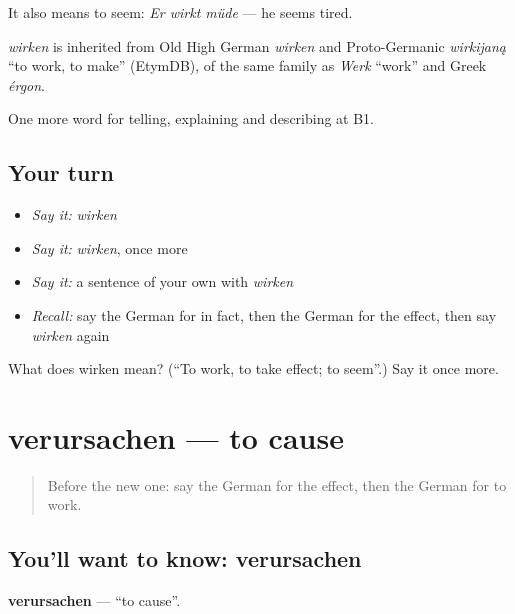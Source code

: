 It also means to seem: \emph{Er wirkt müde} — he seems tired.

\begin{cousinweb}
\emph{wirken} is inherited from Old High German \emph{wirken} and Proto-Germanic \emph{wirkijaną} \textquotedblleft{}to work, to make\textquotedblright{} (EtymDB), of the same family as \emph{Werk} \textquotedblleft{}work\textquotedblright{} and Greek \emph{érgon}.
\end{cousinweb}

\begin{grammarlens}[title={What you've built}]
One more word for telling, explaining and describing at B1.
\end{grammarlens}

\subsection*{Your turn}
\begin{itemize}
\raggedright
  \item \emph{Say it:} \emph{wirken}
  \item \emph{Say it:} \emph{wirken}, once more
  \item \emph{Say it:} a sentence of your own with \emph{wirken}
  \item \emph{Recall:} say the German for in fact, then the German for the effect, then say \emph{wirken} again
\end{itemize}

\begin{tcolorbox}[breakable,colback=teal!4,colframe=teal!35!black,title={Before you move on}]
What does wirken mean? (\textquotedblleft{}To work, to take effect; to seem\textquotedblright{}.) Say it once more.
\end{tcolorbox}
\section[verursachen]{verursachen — to cause}

\label{lesson:GE-C342-verursachen}



\begin{quote}
Before the new one: say the German for the effect, then the German for to work.
\end{quote}

\subsection*{You'll want to know: verursachen}
\textbf{verursachen} — \textquotedblleft{}to cause\textquotedblright{}.

